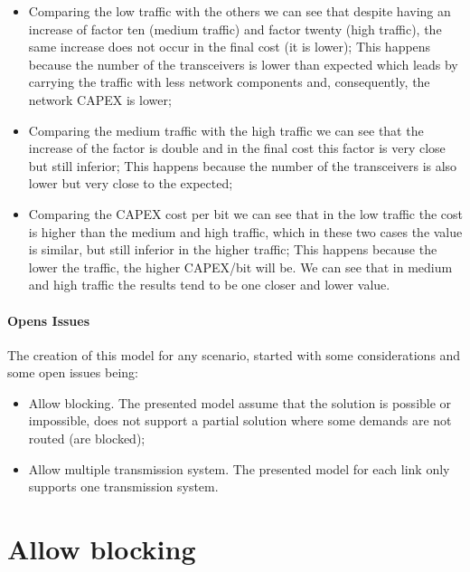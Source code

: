 \begin{itemize}
  \item Comparing the low traffic with the others we can see that despite having an increase of factor ten (medium traffic) and factor twenty (high traffic), the same increase does not occur in the final cost (it is lower);
  \subitem This happens because the number of the transceivers is lower than expected which leads by carrying the traffic with less network components and, consequently, the network CAPEX is lower;
  \item Comparing the medium traffic with the high traffic we can see that the increase of the factor is double and in the final cost this factor is very close but still inferior;
  \subitem This happens because the number of the transceivers is also lower but very close to the expected;
  \item Comparing the CAPEX cost per bit we can see that in the low traffic the cost is higher than the medium and high traffic, which in these two cases the value is similar, but still inferior in the higher traffic;
  \subitem This happens because the lower the traffic, the higher CAPEX/bit will be. We can see that in medium and high traffic the results tend to be one closer and lower value.
\end{itemize}

\vspace{13pt}
\subsubsection{Opens Issues}

The creation of this model for any scenario, started with some considerations and some open issues being:

\begin{itemize}
  \item Allow blocking.
  \subitem The presented model assume that the solution is possible or impossible, does not support a partial solution where some demands are not routed (are blocked);
  \item Allow multiple transmission system.
  \subitem The presented model for each link only supports one transmission system.
\end{itemize}


\newpage
\vspace{11pt}

\chapter{Allow blocking}

